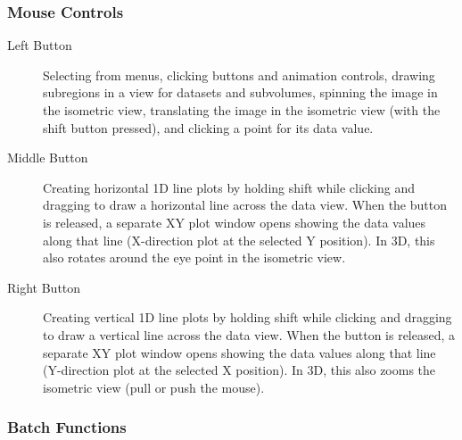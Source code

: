 \documentclass{article}
\begin{document}
\subsubsection{Mouse Controls}

\begin{description}
\item [Left Button]  Selecting from menus, clicking buttons and animation controls,
drawing subregions in a view for datasets and subvolumes, spinning the image
in the isometric view, translating the image in the isometric view (with the
shift button pressed), and clicking a point for its data value.

\item [Middle Button]  Creating horizontal 1D line plots by holding shift while clicking
and dragging to draw a horizontal line across the data view. When the button is released,
a separate XY plot window opens showing the data values along that line (X-direction plot
at the selected Y position). In 3D, this also rotates around the eye point in the isometric view.

\item [Right Button]   Creating vertical 1D line plots by holding shift while clicking
and dragging to draw a vertical line across the data view. When the button is released,
a separate XY plot window opens showing the data values along that line (Y-direction plot
at the selected X position). In 3D, this also zooms the isometric view (pull or push the mouse).

\end{description}


\subsubsection{Batch Functions}
\end{document}
